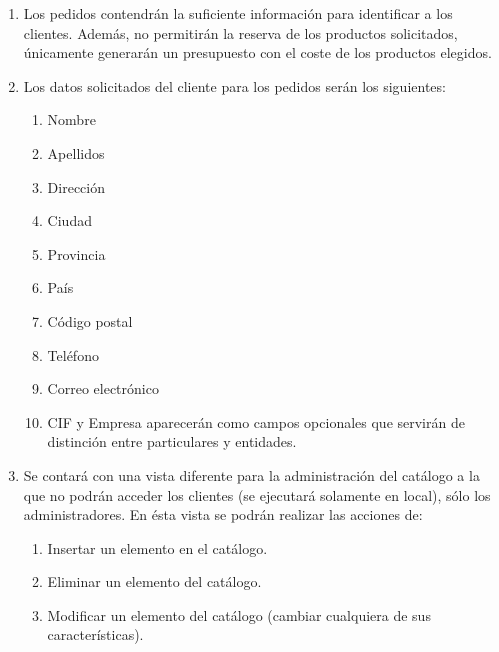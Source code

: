 \begin{enumerate}
\item Los pedidos contendrán la suficiente información para identificar a los clientes. Además, no permitirán la reserva de los productos solicitados, únicamente generarán un presupuesto con el coste de los productos elegidos.

\item Los datos solicitados del cliente para los pedidos serán los siguientes:
	\begin{enumerate}
		\item Nombre 
		\item Apellidos
	    \item Dirección
	    \item Ciudad
	    \item Provincia
	    \item País
	    \item Código postal
	    \item Teléfono
	    \item Correo electrónico
	    \item CIF y Empresa aparecerán como campos opcionales que servirán de distinción entre particulares y entidades.
	\end{enumerate}

\item Se contará con una vista diferente para la administración del catálogo a la que no podrán acceder los clientes (se ejecutará solamente en local), sólo los administradores.
En ésta vista se podrán realizar las acciones de:
	\begin{enumerate}
    	\item Insertar un elemento en el catálogo.
		\item Eliminar un elemento del catálogo.
        \item Modificar un elemento del catálogo (cambiar cualquiera de sus características).
    \end{enumerate}   
\end{enumerate}
